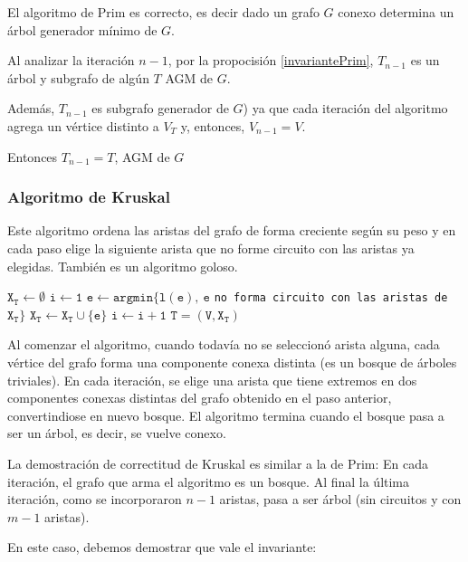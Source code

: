 \begin{theorem}
	El algoritmo de Prim es correcto, es decir dado un grafo \(G\) conexo determina un árbol generador mínimo de \(G\).
\end{theorem}
\begin{demo}
	Al analizar la iteración \(n-1\), por la propocisión \ref{invariantePrim}, \(T_{n-1}\) es un árbol y subgrafo de algún \(T\) AGM de \(G\).
	
	Además, \(T_{n-1}\) es subgrafo generador de \(G\)) ya que cada iteración del algoritmo agrega un vértice distinto a \(V_T\) y, entonces, \(V_{n-1} = V\).
	
	Entonces \(T_{n-1} = T\), AGM de \(G\)
\end{demo}

\subsubsection{Algoritmo de Kruskal}
Este algoritmo ordena las aristas del grafo de forma creciente según su peso y en cada paso elige la siguiente arista que no forme circuito con las aristas ya elegidas. También es un algoritmo goloso.

\begin{algorithmic}
	\State $\mathtt{X_T \gets \emptyset}$
	\State $\mathtt{i \gets 1}$
	\State $\mathtt{e \gets argmin\{l(e),~e}$ \texttt{no forma circuito con las aristas de }$\mathtt{X_T\}}$
	\State $\mathtt{X_T \gets X_T \cup \{e\}}$
	\State $\mathtt{i\gets i + 1}$
	\EndWhile
	\State \Return $\mathtt{T = (V, X_T)}$
	\EndProcedure
\end{algorithmic}

Al comenzar el algoritmo, cuando todavía no se seleccionó arista alguna, cada vértice del grafo forma una componente conexa distinta (es un bosque de árboles triviales). En cada iteración, se elige una arista que tiene extremos en dos componentes conexas distintas del grafo obtenido en el paso anterior, convertindiose en nuevo bosque. El algoritmo termina cuando el bosque pasa a ser un árbol, es decir, se vuelve conexo.

La demostración de correctitud de Kruskal es similar a la de Prim: En cada iteración, el grafo que arma el algoritmo es un bosque. Al final la última iteración, como se incorporaron \(n-1\) aristas, pasa a ser árbol (sin circuitos y con \(m-1\) aristas).

En este caso, debemos demostrar que vale el invariante:

